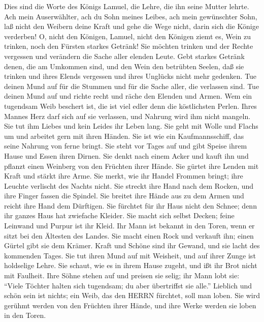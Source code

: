  Dies sind die Worte des Königs Lamuel, die Lehre, die ihn
seine Mutter lehrte.  Ach mein Auserwählter, ach du Sohn
meines Leibes, ach mein gewünschter Sohn,  laß nicht den
Weibern deine Kraft und gehe die Wege nicht, darin sich die Könige
verderben!  O, nicht den Königen, Lamuel, nicht den Königen
ziemt es, Wein zu trinken, noch den Fürsten starkes Getränk!
 Sie möchten trinken und der Rechte vergessen und verändern
die Sache aller elenden Leute.  Gebt starkes Getränk denen,
die am Umkommen sind, und den Wein den betrübten Seelen, 
daß sie trinken und ihres Elends vergessen und ihres Unglücks nicht mehr
gedenken.  Tue deinen Mund auf für die Stummen und für die
Sache aller, die verlassen sind.  Tue deinen Mund auf und
richte recht und räche den Elenden und Armen.  Wem ein
tugendsam Weib beschert ist, die ist viel edler denn die köstlichsten
Perlen.  Ihres Mannes Herz darf sich auf sie verlassen, und
Nahrung wird ihm nicht mangeln.  Sie tut ihm Liebes und
kein Leides ihr Leben lang.  Sie geht mit Wolle und Flachs
um und arbeitet gern mit ihren Händen.  Sie ist wie ein
Kaufmannsschiff, das seine Nahrung von ferne bringt.  Sie
steht vor Tages auf und gibt Speise ihrem Hause und Essen ihren Dirnen.
 Sie denkt nach einem Acker und kauft ihn und pflanzt einen
Weinberg von den Früchten ihrer Hände.  Sie gürtet ihre
Lenden mit Kraft und stärkt ihre Arme.  Sie merkt, wie ihr
Handel Frommen bringt; ihre Leuchte verlischt des Nachts nicht.
 Sie streckt ihre Hand nach dem Rocken, und ihre Finger
fassen die Spindel.  Sie breitet ihre Hände aus zu dem
Armen und reicht ihre Hand dem Dürftigen.  Sie fürchtet für
ihr Haus nicht den Schnee; denn ihr ganzes Haus hat zwiefache Kleider.
 Sie macht sich selbst Decken; feine Leinwand und Purpur
ist ihr Kleid.  Ihr Mann ist bekannt in den Toren, wenn er
sitzt bei den Ältesten des Landes.  Sie macht einen Rock
und verkauft ihn; einen Gürtel gibt sie dem Krämer.  Kraft
und Schöne sind ihr Gewand, und sie lacht des kommenden Tages.
 Sie tut ihren Mund auf mit Weisheit, und auf ihrer Zunge
ist holdselige Lehre.  Sie schaut, wie es in ihrem Hause
zugeht, und ißt ihr Brot nicht mit Faulheit.  Ihre Söhne
stehen auf und preisen sie selig; ihr Mann lobt sie: 
``Viele Töchter halten sich tugendsam; du aber übertriffst sie alle.''
 Lieblich und schön sein ist nichts; ein Weib, das den
HERRN fürchtet, soll man loben.  Sie wird gerühmt werden
von den Früchten ihrer Hände, und ihre Werke werden sie loben in den
Toren.
